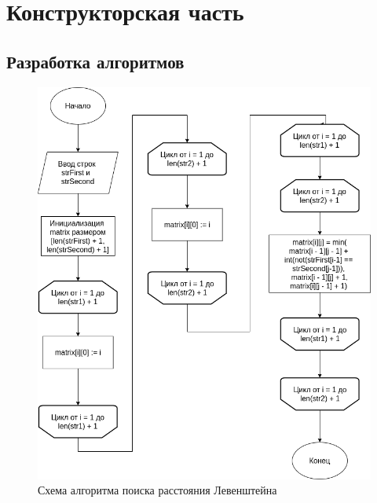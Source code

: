 \chapter{Конструкторская часть}

\section{Разработка алгоритмов}
  
\begin{figure}[h]
    \centering
    \includegraphics[width=180mm]{inc/img/diagramLev.png}
    \caption{Схема алгоритма поиска расстояния Левенштейна}
    \label{img:diagramLev}
\end{figure}


